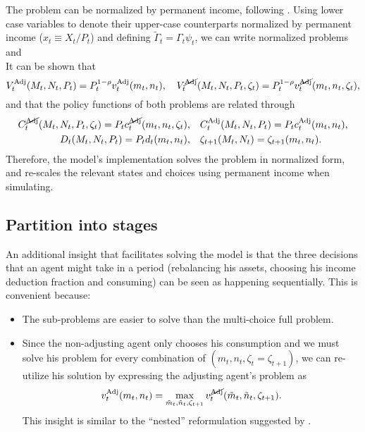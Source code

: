 \documentclass[./RiskyContrib.tex]{subfiles}
\begin{document}
The problem can be normalized by permanent income, following
\cite{Carroll2020solvingmicrodsops}. Using lower case variables to
denote their upper-case counterparts normalized by permanent income ($x_t \equiv X_t/P_t$)
and defining $\tilde{\Gamma}_t = \Gamma_{t}\psi_{t}$, we can write
normalized problems
\begin{equation}\label{eq:bellman_NAdj_norm}

\end{equation}
and
\begin{equation}\label{eq:bellman_Adj_norm}

\end{equation}
It can be shown that
\begin{equation*}
V_{t}^{\text{Adj}}(M_t,N_t,P_t) = P_t^{1-\rho} v_{t}^{\text{Adj}}(m_t,n_t), \quad
V_{t}^{\cancel{\text{Adj}}}(M_t,N_t,P_t,\zeta_t) = P_t^{1-\rho} v_{t}^{\cancel{\text{Adj}}}(m_t,n_t,\zeta_t),
\end{equation*}
and that the policy functions of both problems are related through
\begin{equation*}
\begin{split}
C_t^{\cancel{\text{Adj}}}(M_t,N_t,P_t,\zeta_t) = P_t c_t^{\cancel{\text{Adj}}}(m_t,n_t,\zeta_t),& \quad C_t^{\text{Adj}}(M_t,N_t,P_t) = P_t c_t^{\text{Adj}}(m_t,n_t),\\
D_t(M_t,N_t,P_t) = P_t d_t(m_t,n_t),& \quad \zeta_{t+1}(M_t,N_t) = \zeta_{t+1}(m_t,n_t).
\end{split}
\end{equation*}
Therefore, the model's implementation solves the problem in normalized form, and re-scales
the relevant states and choices using permanent income when simulating.

\subsection{Partition into stages}

An additional insight that facilitates solving the model is that the three decisions
that an agent might take in a period (rebalancing his assets, choosing his income
deduction fraction and consuming) can be seen as happening sequentially. This is
convenient because:
\begin{itemize}
\item The sub-problems are easier to solve than the multi-choice full problem.
\item Since the non-adjusting agent only chooses his consumption and we must
solve his problem for every combination of $(m_t, n_t, \zeta_t=\zeta_{t+1})$, we can re-utilize
his solution by expressing the adjusting agent's  problem as
\begin{equation*}
v_t^{\text{Adj}}(m_t,n_t) = \max_{\tilde{m}_t, \tilde{n}_t, \zeta_{t+1}} v_t^{\cancel{\text{Adj}}}(\tilde{m}_t, \tilde{n}_t, \zeta_{t+1}).
\end{equation*}
This insight is similar to the ``nested'' reformulation suggested by \cite{Druedahl2020compecon}.
\end{itemize}
\end{document}

